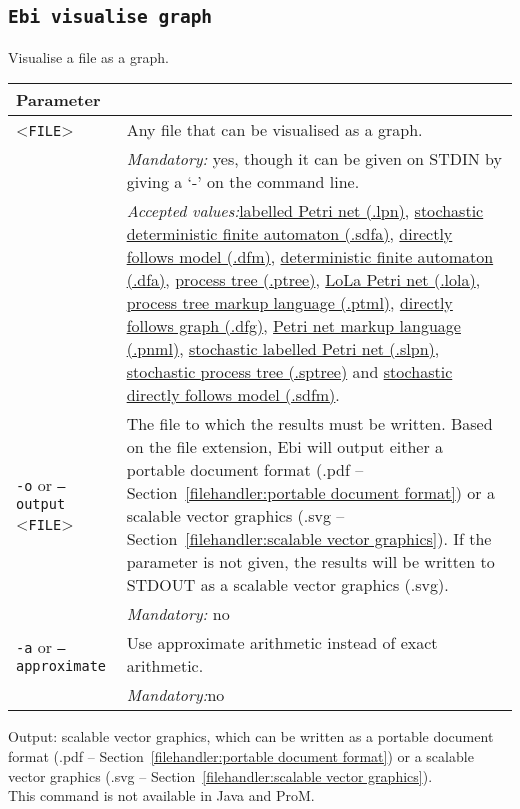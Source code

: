 {\subsection{\texttt{Ebi visualise graph}}
\label{command:Ebi visualise graph}
Visualise a file as a graph.\\
\begin{tabularx}{\linewidth}{lX}
\toprule
Parameter \\\midrule
<\texttt{FILE}>&Any file that can be visualised as a graph.\\
&\textit{Mandatory:} \quad yes, though it can be given on STDIN by giving a `-' on the command line.\\
&\textit{Accepted values:}\quad \hyperref[filehandler:labelled Petri net]{labelled Petri net (.lpn)}, \hyperref[filehandler:stochastic deterministic finite automaton]{stochastic deterministic finite automaton (.sdfa)}, \hyperref[filehandler:directly follows model]{directly follows model (.dfm)}, \hyperref[filehandler:deterministic finite automaton]{deterministic finite automaton (.dfa)}, \hyperref[filehandler:process tree]{process tree (.ptree)}, \hyperref[filehandler:LoLa Petri net]{LoLa Petri net (.lola)}, \hyperref[filehandler:process tree markup language]{process tree markup language (.ptml)}, \hyperref[filehandler:directly follows graph]{directly follows graph (.dfg)}, \hyperref[filehandler:Petri net markup language]{Petri net markup language (.pnml)}, \hyperref[filehandler:stochastic labelled Petri net]{stochastic labelled Petri net (.slpn)}, \hyperref[filehandler:stochastic process tree]{stochastic process tree (.sptree)} and \hyperref[filehandler:stochastic directly follows model]{stochastic directly follows model (.sdfm)}.\\
\texttt{-o} or \texttt{--output} <\texttt{FILE}> &
The file to which the results must be written. Based on the file extension, Ebi will output either a portable document format (.pdf -- Section~\ref{filehandler:portable document format}) or a scalable vector graphics (.svg -- Section~\ref{filehandler:scalable vector graphics}).
If the parameter is not given, the results will be written to STDOUT as a scalable vector graphics (.svg).\\
&\textit{Mandatory:} \quad no\\
\texttt{-a} or \texttt{--approximate} & Use approximate arithmetic instead of exact arithmetic.\\
&\textit{Mandatory:}\quad no\\
\bottomrule
\end{tabularx}
\noindent Output: scalable vector graphics, which can be written as a portable document format (.pdf -- Section~\ref{filehandler:portable document format}) or a scalable vector graphics (.svg -- Section~\ref{filehandler:scalable vector graphics}).
\\This command is not available in Java and ProM.
}
